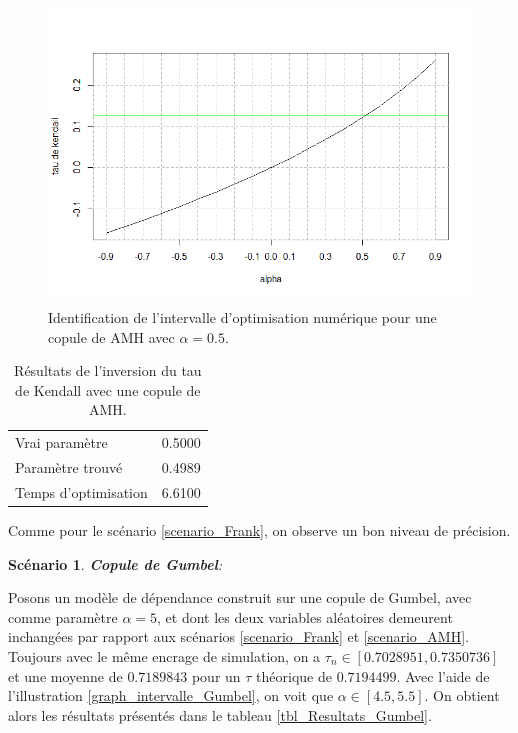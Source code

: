\documentclass{article}
\newtheorem{scenario}{Scénario}
\begin{document}
 	 \begin{figure}[H]
 	 	\centering
 	 	\includegraphics[height=8cm]{Graph/intevalle_AMH.png}
 	 	\caption[Identification de l'intervalle d'optimisation numérique pour le scénario \ref{scenario_AMH}]
 	 	{Identification de l'intervalle d'optimisation numérique pour une copule de AMH avec $\alpha = 0.5$.} 
 	 	\label{graph_intervalle_AMH}
 	 \end{figure}
  
  	 \begin{table}[H]
  		\centering
  		\begin{tabular}{lr}
  			\hline
  			Vrai paramètre & 0.5000 \\ 
  			Paramètre trouvé & 0.4989 \\ 
  			Temps d'optimisation & 6.6100 \\
  			\hline 
  		\end{tabular}
  		\caption{Résultats de l'inversion du tau de Kendall avec une copule de AMH.}
  		\label{tbl_Resultats_AMH}
  	\end{table}
  
  	Comme pour le scénario \ref{scenario_Frank}, on observe un bon niveau de précision.
  	
 	 
 	\begin{scenario}
 		\textbf{Copule de Gumbel}:
 		\label{scenario_Gumbel}
 	\end{scenario}
	Posons un modèle de dépendance construit sur une copule de Gumbel, avec comme paramètre $\alpha = 5$, et dont les deux variables aléatoires demeurent inchangées par rapport aux scénarios \ref{scenario_Frank} et \ref{scenario_AMH}. Toujours avec le même encrage de simulation, on a $\tau_n \in [0.7028951, 0.7350736]$ et une moyenne de $0.7189843$ pour un $\tau$ théorique de $0.7194499$. Avec l'aide de l'illustration \ref{graph_intervalle_Gumbel}, on voit que $\alpha \in [4.5, 5.5]$. On obtient alors les résultats présentés dans le tableau \ref{tbl_Resultats_Gumbel}.
	
\end{document}
